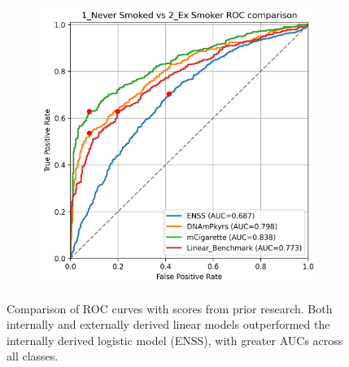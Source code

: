 \documentclass[draft]{article} %
\begin{document}
\begin{figure}[p]
\begin{subfigure}{0.48\linewidth}
    \end{subfigure}
    \begin{subfigure}{0.48\linewidth}
        \centering
        \includegraphics[width=\linewidth]{comparison_1v2.png}
    \end{subfigure}
    \caption[Comparison of ROC curves with models from prior research]{Comparison of ROC curves with scores from prior research. Both internally and externally derived linear models outperformed the internally derived logistic model (ENSS), with greater AUCs across all classes.}
    \label{fig:comparison-rocs}
\end{figure}
\end{document}
